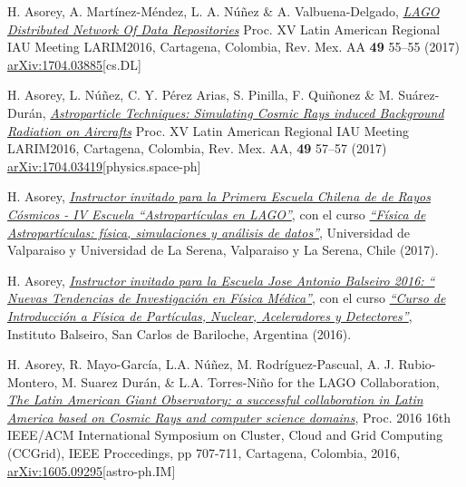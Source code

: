 \begin{etaremune}
\item {}H. Asorey, A. Martínez-Méndez, L. A. Núñez \& A. Valbuena-Delgado, \href{http://www.astroscu.unam.mx/rmaa/RMxAC..49/PDF/RMxAC..49\_oral5.pdf}{\emph{LAGO Distributed Network Of Data Repositories}} \en Proc. XV Latin American Regional IAU Meeting LARIM2016, Cartagena, Colombia, Rev. Mex. AA {\bf{49}} 55--55 (2017) \href{http://arxiv.org/abs/1704.03885}{arXiv:1704.03885}[cs.DL]

\item {}H. Asorey, L. Núñez, C. Y. Pérez Arias, S. Pinilla, F. Quiñonez \& M. Suárez-Durán, \href{http://www.astroscu.unam.mx/rmaa/RMxAC..49/PDF/RMxAC..49\_oral7.pdf}{\emph{Astroparticle Techniques: Simulating Cosmic Rays induced Background Radiation on Aircrafts}} \en Proc. XV Latin American Regional IAU Meeting LARIM2016, Cartagena, Colombia, Rev. Mex. AA, {\bf{49}} 57--57 (2017) \href{http://arxiv.org/abs/1704.03419}{arXiv:1704.03419}[physics.space-ph]

\item {} H. Asorey, \href{http://ifa.uv.cl/rayoscosmicos/}{\emph{Instructor invitado para la Primera Escuela Chilena de de Rayos Cósmicos - IV Escuela ``Astropartículas en LAGO''}}, con el curso \href{https://github.com/lagoproject/astroparticulas}{\emph{``Física de Astropartículas: física, simulaciones y análisis de datos''}}, Universidad de Valparaiso y Universidad de La Serena, Valparaiso y La Serena, Chile (2017).

\item {} H. Asorey, \href{https://fisica.cab.cnea.gov.ar/jab2016/}{\emph{Instructor invitado para la Escuela Jose Antonio Balseiro 2016: `` Nuevas Tendencias de Investigación en Física Médica''}}, con el curso \href{ https://github.com/asoreyh/intro-nuclear-fisica-medica }{\emph{``Curso de Introducción a Física de Partículas, Nuclear, Aceleradores y Detectores''}}, Instituto Balseiro, San Carlos de Bariloche, Argentina (2016).

\item {} H. Asorey, R. Mayo-García, L.A. Núñez, M. Rodríguez-Pascual, A. J. Rubio-Montero, M. Suarez Durán, \& L.A. Torres-Niño for the LAGO Collaboration, {\emph{\href{http://dx.doi.org/10.1109/CCGrid.2016.110}{The Latin American Giant Observatory: a successful collaboration in Latin America based on Cosmic Rays and computer science domains}}}, \en Proc. 2016 16th IEEE/ACM International Symposium on Cluster, Cloud and Grid Computing (CCGrid), IEEE Proccedings, pp 707-711, Cartagena, Colombia, 2016, \href{http://arxiv.org/abs/1605.09295}{arXiv:1605.09295}[astro-ph.IM] 


\end{etaremune}
